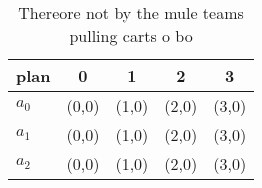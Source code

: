 \documentclass[a4paper]{article}
\begin{document}
\begin{table}
\begin{adjustbox}{width=0.6\columnwidth}
\begin{tabular}{|l|l|l|l|l|}
\hline
\textbf{plan} & \multicolumn{1}{c|}{\textbf{0}} & \multicolumn{1}{c|}{\textbf{1}} & \multicolumn{1}{c|}{\textbf{2}} & \multicolumn{1}{c|}{\textbf{3}} \\ \hline
\textbf{$a_0$}  & (0,0) & (1,0) & (2,0) & (3,0) \\ \hline
\textbf{$a_1$}  & (0,0) & (1,0) & (2,0) & (3,0) \\ \hline
\textbf{$a_2$}  & (0,0) & (1,0) & (2,0) & (3,0) \\ \hline
\end{tabular}
\end{adjustbox}
\caption{Thereore not by the mule teams pulling carts o bo
}
\end{table}
\end{document}
